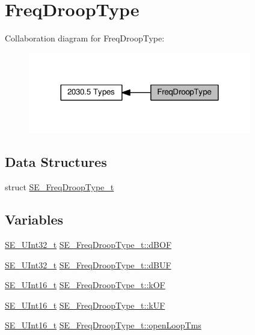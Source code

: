 \hypertarget{group__FreqDroopType}{}\section{Freq\+Droop\+Type}
\label{group__FreqDroopType}
Collaboration diagram for Freq\+Droop\+Type\+:\nopagebreak
\begin{figure}[H]
\begin{center}
\leavevmode
\includegraphics[width=276pt]{group__FreqDroopType}
\end{center}
\end{figure}
\subsection*{Data Structures}
\begin{DoxyCompactItemize}
\item 
struct \hyperlink{structSE__FreqDroopType__t}{S\+E\+\_\+\+Freq\+Droop\+Type\+\_\+t}
\end{DoxyCompactItemize}
\subsection*{Variables}
\begin{DoxyCompactItemize}
\item 
\hyperlink{group__UInt32_ga70bd4ecda3c0c85d20779d685a270cdb}{S\+E\+\_\+\+U\+Int32\+\_\+t} \hyperlink{group__FreqDroopType_gac94af74f0f95cfdfd309edf0b1332b60}{S\+E\+\_\+\+Freq\+Droop\+Type\+\_\+t\+::d\+B\+OF}
\item 
\hyperlink{group__UInt32_ga70bd4ecda3c0c85d20779d685a270cdb}{S\+E\+\_\+\+U\+Int32\+\_\+t} \hyperlink{group__FreqDroopType_ga4b8bb547bb1d3615836aa7fda01d55fe}{S\+E\+\_\+\+Freq\+Droop\+Type\+\_\+t\+::d\+B\+UF}
\item 
\hyperlink{group__UInt16_gac68d541f189538bfd30cfaa712d20d29}{S\+E\+\_\+\+U\+Int16\+\_\+t} \hyperlink{group__FreqDroopType_ga34e6fdc066c8a02a83fd66e680b53645}{S\+E\+\_\+\+Freq\+Droop\+Type\+\_\+t\+::k\+OF}
\item 
\hyperlink{group__UInt16_gac68d541f189538bfd30cfaa712d20d29}{S\+E\+\_\+\+U\+Int16\+\_\+t} \hyperlink{group__FreqDroopType_gaa2d7a3faec478c0774843e3082b281c4}{S\+E\+\_\+\+Freq\+Droop\+Type\+\_\+t\+::k\+UF}
\item 
\hyperlink{group__UInt16_gac68d541f189538bfd30cfaa712d20d29}{S\+E\+\_\+\+U\+Int16\+\_\+t} \hyperlink{group__FreqDroopType_gafca704755da556995f473d9fd5d40383}{S\+E\+\_\+\+Freq\+Droop\+Type\+\_\+t\+::open\+Loop\+Tms}
\end{DoxyCompactItemize}


